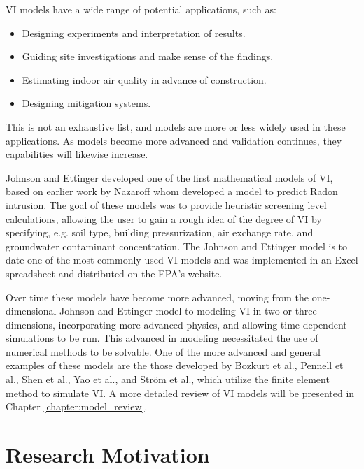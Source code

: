 \documentclass[../thesis.tex]{subfiles}
\begin{document}
VI models have a wide range of potential applications, such as:
\begin{itemize}
  \item Designing experiments and interpretation of results.
  \item Guiding site investigations and make sense of the findings.
  \item Estimating indoor air quality in advance of construction.
  \item Designing mitigation systems.
\end{itemize}
This is not an exhaustive list, and models are more or less widely used in these applications.
As models become more advanced and validation continues, they capabilities will likewise increase.\par

Johnson and Ettinger developed one of the first mathematical models of VI\cite{johnson_heuristic_1991}, based on earlier work by Nazaroff whom developed a model to predict Radon intrusion\cite{nazaroff_radon_1985}.
The goal of these models was to provide heuristic screening level calculations, allowing the user to gain a rough idea of the degree of VI by specifying, e.g. soil type, building pressurization, air exchange rate, and groundwater contaminant concentration.
The Johnson and Ettinger model is to date one of the most commonly used VI models and was implemented in an Excel spreadsheet and distributed on the EPA's website.\par

Over time these models have become more advanced, moving from the one-dimensional Johnson and Ettinger model to modeling VI in two or three dimensions, incorporating more advanced physics, and allowing time-dependent simulations to be run.
This advanced in modeling necessitated the use of numerical methods to be solvable.
One of the more advanced and general examples of these models are the those developed by Bozkurt et al.\cite{bozkurt_simulation_2009}, Pennell et al.\cite{pennell_development_2009}, Shen et al.\cite{shen_numerical_2012}, Yao et al.\cite{yao_comparison_2011}, and Ström et al.\cite{strom_factors_2019}, which utilize the finite element method to simulate VI.
A more detailed review of VI models will be presented in Chapter \ref{chapter:model_review}.\par


\section{Research Motivation}
\end{document}
